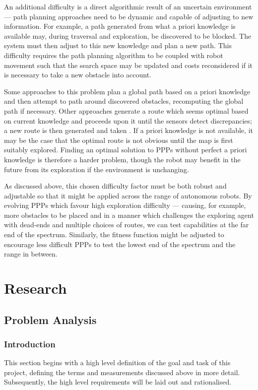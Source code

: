 \documentclass[authoryearcitations]{UoYCSproject}
\begin{document}
An additional difficulty is a direct algorithmic result of an uncertain environment --- path planning approaches need to be dynamic and capable of adjusting to new information. For example, a path generated from what a priori knowledge is available may, during traversal and exploration, be discovered to be blocked. The system must then adjust to this new knowledge and plan a new path. This difficulty requires the path planning algorithm to be coupled with robot movement such that the search space may be updated and costs reconsidered if it is necessary to take a new obstacle into account.

Some approaches to this problem plan a global path based on a priori knowledge and then attempt to path around discovered obstacles, recomputing the global path if necessary. Other approaches generate a route which seems optimal based on current knowledge and proceeds upon it until the sensors detect discrepancies; a new route is then generated and taken \cite{stentz}. If a priori knowledge is not available, it may be the case that the optimal route is not obvious until the map is first suitably explored. Finding an optimal solution to PPPs without perfect a priori knowledge is therefore a harder problem, though the robot may benefit in the future from its exploration if the environment is unchanging.

As discussed above, this chosen difficulty factor must be both robust and adjustable so that it might be applied across the range of autonomous robots. By evolving PPPs which favour high exploration difficulty --- causing, for example, more obstacles to be placed and in a manner which challenges the exploring agent with dead-ends and multiple choices of routes, we can test capabilities at the far end of the spectrum.
Similarly, the fitness function might be adjusted to encourage less difficult PPPs to test the lowest end of the spectrum and the range in between.

\part{Research}
\label{sec:research}

\chapter{Problem Analysis}
\label{cha:ProbAnalysis}
\section{Introduction}
\label{sec:pa1}
This section begins with a high level definition of the goal and task of this project, defining the terms and measurements discussed above in more detail. Subsequently, the high level requirements will be laid out and rationalised.
\end{document}
